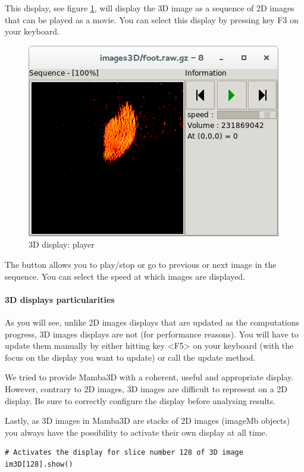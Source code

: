 \documentclass[a4paper,10pt,oneside]{article}
\begin{document}
This display, see figure \ref{fig:dis3D_play}, will display the 3D image
as a sequence of 2D images that can be played as a movie.
You can select this display by pressing key F3 on your keyboard.

\begin{figure}
\centering
\includegraphics[scale=0.5]{images/dis3D_player.png}
\caption{3D display: player}
\label{fig:dis3D_play}
\end{figure}

The button allows you to play/stop or go to previous or next image in the
sequence. You can select the speed at which images are displayed.

\paragraph{3D displays particularities}
As you will see, unlike 2D images displays that are updated as the computations
progress, 3D images displays are not (for performance reasons). You will have
to update them manually by either hitting key <F5> on your keyboard (with
the focus on the display you want to update) or call the update method.

We tried to provide Mamba3D with a coherent, useful and appropriate display.
However, contrary to 2D images, 3D images are difficult to represent on a 2D
display. Be sure to correctly configure the display before analysing results.

Lastly, as 3D images in Mamba3D are stacks of 2D images (imageMb objects) you 
always have the possibility to activate their own display at all time.

\lstset{language=Python}
\begin{lstlisting}
# Activates the display for slice number 128 of 3D image
im3D[128].show()
\end{lstlisting}
\end{document}
